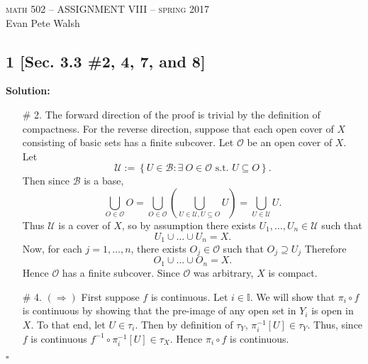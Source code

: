 \documentclass[12pt]{article}
\newcounter{ProofCounter}
\newenvironment{Solution}{\stepcounter{ProofCounter}\textbf{Solution:}}{\hfill$\square$}
\begin{document}
\thispagestyle{empty}
\begin{center}
  \Large \textsc{math 502 -- ASSIGNMENT VIII -- spring 2017} \\ 
  \vspace{5mm}
  \large Evan Pete Walsh
\end{center}


\subsection*{1 [Sec. 3.3 \#2, 4, 7, and 8]}
\begin{Solution}
  \begin{enumerate}
    \item[\# 2.] The forward direction of the proof is trivial by the definition of compactness. For the reverse direction, suppose that each open
      cover of $X$ consisting of basic sets has a finite subcover. Let $\mathcal{O}$ be an open cover of $X$. Let 
      \[
        \mathcal{U} := \left\{ U \in \mathcal{B} : \exists\ O \in \mathcal{O} \text{ s.t. } U \subseteq O \right\}.
      \]
      Then since $\mathcal{B}$ is a base, 
      \[
        \bigcup_{O \in \mathcal{O}}O = \bigcup_{O \in \mathcal{O}}\left(\bigcup_{U\in \mathcal{U}, U \subseteq O}U \right)= \bigcup_{U\in \mathcal{U}}U.
      \]
      Thus $\mathcal{U}$ is a cover of $X$, so by assumption there exists $U_1, \dots, U_n \in \mathcal{U}$ such that 
      \[ U_1 \cup \dots \cup U_n = X. \]
      Now, for each $j = 1,\dots, n$, there exists $O_j \in \mathcal{O}$ such that $O_j \supseteq U_j$ Therefore 
      \[ O_1 \cup \dots \cup O_n = X. \]
      Hence $\mathcal{O}$ has a finite subcover. Since $\mathcal{O}$ was arbitrary, $X$ is compact.

    \item[\# 4.] $(\Rightarrow)$ First suppose $f$ is continuous. Let $i \in \mathbb{I}$. We will show that $\pi_i \circ f$ is continuous by
      showing that the pre-image of any open set in $Y_i$ is open in $X$.
      To that end, let $U \in \tau_{i}$. Then by definition of $\tau_{Y}$,
      $\pi_i^{-1}[U] \in \tau_Y$. Thus, since $f$ is continuous $f^{-1}\circ \pi_{i}^{-1}[U] \in \tau_X$. Hence $\pi_i \circ f$ is continuous.


\end{enumerate}
\end{Solution}
\end{document}
